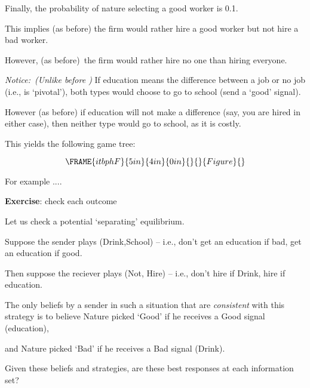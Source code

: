 \documentclass{article}
\begin{document}
\bigskip

Finally, the probability of nature selecting a good worker is 0.1. \ 

This implies (as before) the firm would rather hire a good worker but not
hire a bad worker.

However, (as before)\ the firm would rather hire no one than hiring everyone.

\bigskip

\textit{Notice:\ (Unlike before ) }If education means the difference between
a job or no job (i.e., is `pivotal'), both types would choose to go to
school (send a `good' signal).

However (as before) if education will not make a difference (say, you are
hired in either case), then neither type would go to school, as it is costly.

This yields the following game tree:

\begin{equation}
\FRAME{itbphF}{5in}{4in}{0in}{}{}{Figure}{\special{language "Scientific
Word";type "GRAPHIC";maintain-aspect-ratio TRUE;display "USEDEF";valid_file
"T";width 5in;height 4in;depth 0in;original-width 7.2834in;original-height
5.7086in;cropleft "0";croptop "1";cropright "1";cropbottom "0";tempfilename
'JSH9C725.wmf';tempfile-properties "XPR";}}
\end{equation}

For example ....

\bigskip 

\textbf{Exercise}: check each outcome

\bigskip

Let us check a potential `separating' equilibrium.

Suppose the sender plays (Drink,School) -- i.e., don't get an education if
bad, get an education if good.

Then suppose the reciever plays (Not, Hire) -- i.e., don't hire if Drink,
hire if education.

\bigskip

The only beliefs by a sender in such a situation that are \textit{consistent}
with this strategy is to believe Nature picked `Good' if he receives a Good
signal (education),

and Nature picked `Bad' if he receives a Bad signal (Drink). \ 

\bigskip

Given these beliefs and strategies, are these best responses at each
information set?\bigskip
\end{document}

